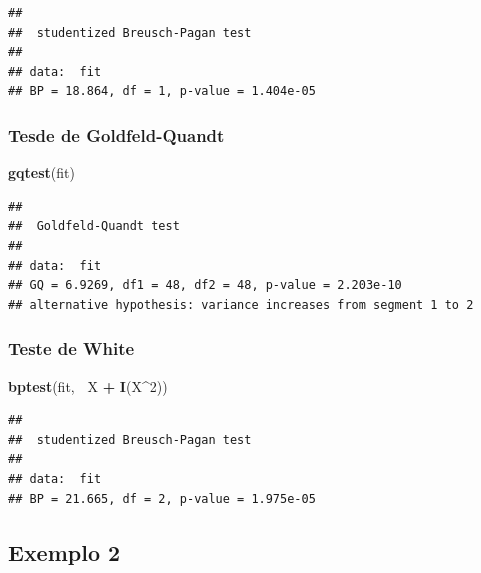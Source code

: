 \documentclass[a4paper, 12pt]{article}
\newenvironment{Shaded}{\begin{snugshade}}{\end{snugshade}}
\newcommand{\DecValTok}[1]{\textcolor[rgb]{0.00,0.00,0.81}{#1}}
\newcommand{\KeywordTok}[1]{\textcolor[rgb]{0.13,0.29,0.53}{\textbf{#1}}}
\newcommand{\NormalTok}[1]{#1}
\newcommand{\OperatorTok}[1]{\textcolor[rgb]{0.81,0.36,0.00}{\textbf{#1}}}
\newcommand{\StringTok}[1]{\textcolor[rgb]{0.31,0.60,0.02}{#1}}
\begin{document}
\begin{verbatim}
## 
##  studentized Breusch-Pagan test
## 
## data:  fit
## BP = 18.864, df = 1, p-value = 1.404e-05
\end{verbatim}

\hypertarget{tesde-de-goldfeld-quandt}{%
\subsubsection{Tesde de
Goldfeld-Quandt}\label{tesde-de-goldfeld-quandt}}

\begin{Shaded}
\begin{Highlighting}[]
\KeywordTok{gqtest}\NormalTok{(fit)}
\end{Highlighting}
\end{Shaded}

\begin{verbatim}
## 
##  Goldfeld-Quandt test
## 
## data:  fit
## GQ = 6.9269, df1 = 48, df2 = 48, p-value = 2.203e-10
## alternative hypothesis: variance increases from segment 1 to 2
\end{verbatim}

\hypertarget{teste-de-white-1}{%
\subsubsection{Teste de White}\label{teste-de-white-1}}

\begin{Shaded}
\begin{Highlighting}[]
\KeywordTok{bptest}\NormalTok{(fit, }\OperatorTok{~}\NormalTok{X }\OperatorTok{+}\StringTok{ }\KeywordTok{I}\NormalTok{(X}\OperatorTok{^}\DecValTok{2}\NormalTok{))}
\end{Highlighting}
\end{Shaded}

\begin{verbatim}
## 
##  studentized Breusch-Pagan test
## 
## data:  fit
## BP = 21.665, df = 2, p-value = 1.975e-05
\end{verbatim}

\hypertarget{exemplo-2}{%
\subsection{Exemplo 2}\label{exemplo-2}}
\end{document}

